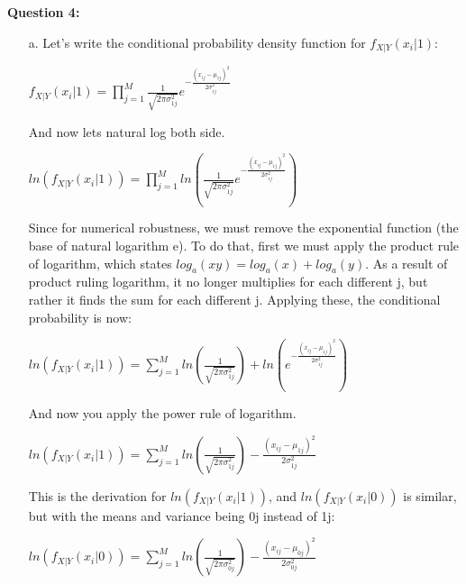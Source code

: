 \documentclass{article}
\begin{document}
\textbf{Question 4:}
\begin{enumerate}
	\item[a.] Let's write the conditional probability density function for $f_{X|Y}(x_{i}| 1)$:
	\begin{center}
		$f_{X|Y}(x_{i}| 1) = \prod_{j=1}^{M} \displaystyle \frac{1}{\sqrt{2\pi \sigma_{1j}^{2}}}e^{-\displaystyle \frac{(x_{ij} - \mu_{1j})^2}{2\sigma_{1j}^2}}$
	\end{center}
	And now lets natural log both side.
	\begin{center}
		$ln(f_{X|Y}(x_{i}| 1)) = \prod_{j=1}^{M} ln(\displaystyle \frac{1}{\sqrt{2\pi \sigma_{1j}^{2}}}e^{-\displaystyle \frac{(x_{ij} - \mu_{1j})^2}{2\sigma_{1j}^2}})$
	\end{center}
	Since for numerical robustness, we must remove the exponential function (the base of natural logarithm e). To do that, first we must apply the product rule of logarithm, which states
	$log_{a}(xy) = log_{a}(x) + log_{a}(y)$. As a result of product ruling logarithm, it no longer multiplies for each different j, but rather it finds the sum for each different j. Applying these,
	the conditional probability is now:
	\begin{center}
		$ln(f_{X|Y}(x_{i}| 1)) = \sum_{j=1}^{M} ln(\displaystyle \frac{1}{\sqrt{2\pi \sigma_{1j}^{2}}}) + ln(e^{-\displaystyle \frac{(x_{ij} - \mu_{1j})^2}{2\sigma_{1j}^2}})$ \\
	\end{center}
	And now you apply the power rule of logarithm.
	\begin{center}
		$ln(f_{X|Y}(x_{i}| 1)) = \sum_{j=1}^{M} ln(\displaystyle \frac{1}{\sqrt{2\pi \sigma_{1j}^{2}}}) - \displaystyle \frac{(x_{ij} - \mu_{1j})^2}{2\sigma_{1j}^2}$
	\end{center}
	This is the derivation for $ln(f_{X|Y}(x_{i} | 1))$, and $ln(f_{X|Y}(x_{i} | 0))$ is similar, but with the means and variance being 0j instead of 1j:
	\begin{center}
		$ln(f_{X|Y}(x_{i}| 0)) = \sum_{j=1}^{M} ln(\displaystyle \frac{1}{\sqrt{2\pi \sigma_{0j}^{2}}}) - \displaystyle \frac{(x_{ij} - \mu_{0j})^2}{2\sigma_{0j}^2}$
	\end{center}
	

\end{enumerate}
\end{document}
